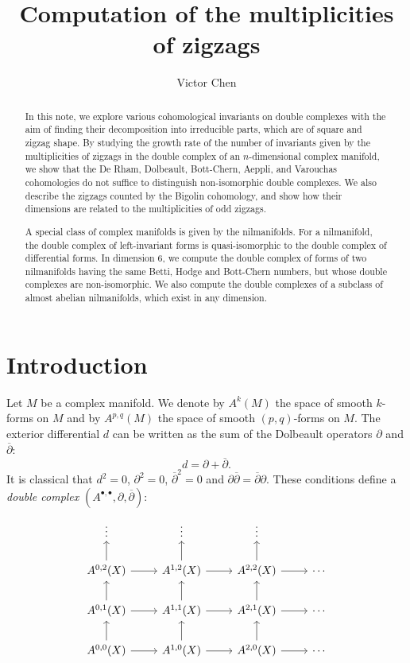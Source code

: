\documentclass[leqno]{article}
\title{Computation of the multiplicities of zigzags}
\date{}
\author{Victor Chen}
\theoremstyle{definition}
\numberwithin{equation}{section}
\begin{document}
\maketitle

\begin{abstract}
In this note, we explore various cohomological invariants on double complexes with the aim of finding their decomposition into irreducible parts, which are of square and zigzag shape. By studying the growth rate of the number of invariants given by the multiplicities of zigzags in the double complex of an $n$-dimensional complex manifold, we show that the De Rham, Dolbeault, Bott-Chern, Aeppli, and Varouchas cohomologies do not suffice to distinguish non-isomorphic double complexes. We also describe the zigzags counted by the Bigolin cohomology, and show how their dimensions are related to the multiplicities of odd zigzags.

A special class of complex manifolds is given by the nilmanifolds. For a nilmanifold, the double complex of left-invariant forms is quasi-isomorphic to the double complex of differential forms. In dimension $6$, we compute the double complex of forms of two nilmanifolds having the same Betti, Hodge and Bott-Chern numbers, but whose double complexes are non-isomorphic. We also compute the double complexes of a subclass of almost abelian nilmanifolds, which exist in any dimension.
\end{abstract}

\tableofcontents

\section{Introduction}
Let $M$ be a complex manifold. 
We denote by $A^k(M)$ the space of smooth $k$-forms on $M$ and by $A^{p, q}(M)$ the space of smooth $(p, q)$-forms on $M$. 
The exterior differential $d$ can be written as the sum of the Dolbeault operators $\partial$ and $\overline{\partial}$:
\[
d
=
\partial
+
\overline{\partial}.
\]
It is classical that $d^2 = 0$, $\partial^2 = 0$, $\overline{\partial}^2=0$ and $\partial \overline{\partial} = \overline{\partial} \partial$. These conditions define a {\sl double complex} $(A^{\bullet, \bullet}, \partial, \overline{\partial})$:
\[
\begin{tikzcd}[scale=0.3em]
\vdots & \vdots & \vdots & \empty \\
A^{0, 2}(X) \arrow[u] \arrow[r]  & A^{1, 2}(X) \arrow[u] \arrow[r] & A^{2, 2}(X) \arrow[u] \arrow[r] &\cdots \\
A^{0, 1}(X) \arrow[u] \arrow[r]  & A^{1, 1}(X) \arrow[u] \arrow[r] & A^{2, 1}(X) \arrow[u] \arrow[r] &\cdots \\
A^{0, 0}(X) \arrow[u] \arrow[r]  & A^{1, 0}(X) \arrow[u] \arrow[r] & A^{2, 0}(X) \arrow[u] \arrow[r] &\cdots \\
\end{tikzcd}
\]
\end{document}
